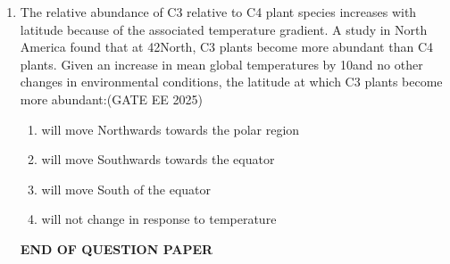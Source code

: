\begin{enumerate}[leftmargin=*,label=\textbf{Q.\arabic*},resume]
\item The relative abundance of C3 relative to C4 plant species increases with latitude because of the associated temperature gradient. A study in North America found that at 42\degree North, C3 plants become more abundant than C4 plants. Given an increase in mean global temperatures by 10\degree and no other changes in environmental conditions, the latitude at which C3 plants become more abundant:\hfill {(GATE EE 2025)}
\begin{enumerate}
\item will move Northwards towards the polar region
\item will move Southwards towards the equator
\item will move South of the equator
\item will not change in response to temperature
\end{enumerate}
\begin{center}
  \textbf{END OF QUESTION PAPER}  
\end{center}
\end{enumerate}



